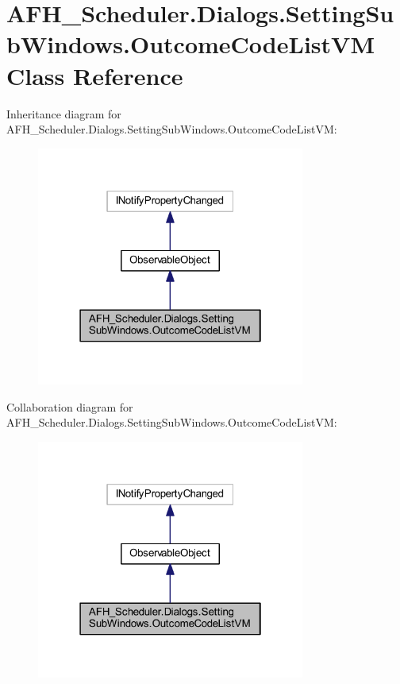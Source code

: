 \section{A\+F\+H\+\_\+\+Scheduler.\+Dialogs.\+Setting\+Sub\+Windows.\+Outcome\+Code\+List\+VM Class Reference}
\label{class_a_f_h___scheduler_1_1_dialogs_1_1_setting_sub_windows_1_1_outcome_code_list_v_m}


Inheritance diagram for A\+F\+H\+\_\+\+Scheduler.\+Dialogs.\+Setting\+Sub\+Windows.\+Outcome\+Code\+List\+VM\+:
\nopagebreak
\begin{figure}[H]
\begin{center}
\leavevmode
\includegraphics[width=250pt]{class_a_f_h___scheduler_1_1_dialogs_1_1_setting_sub_windows_1_1_outcome_code_list_v_m__inherit__graph}
\end{center}
\end{figure}


Collaboration diagram for A\+F\+H\+\_\+\+Scheduler.\+Dialogs.\+Setting\+Sub\+Windows.\+Outcome\+Code\+List\+VM\+:
\nopagebreak
\begin{figure}[H]
\begin{center}
\leavevmode
\includegraphics[width=250pt]{class_a_f_h___scheduler_1_1_dialogs_1_1_setting_sub_windows_1_1_outcome_code_list_v_m__coll__graph}
\end{center}
\end{figure}
